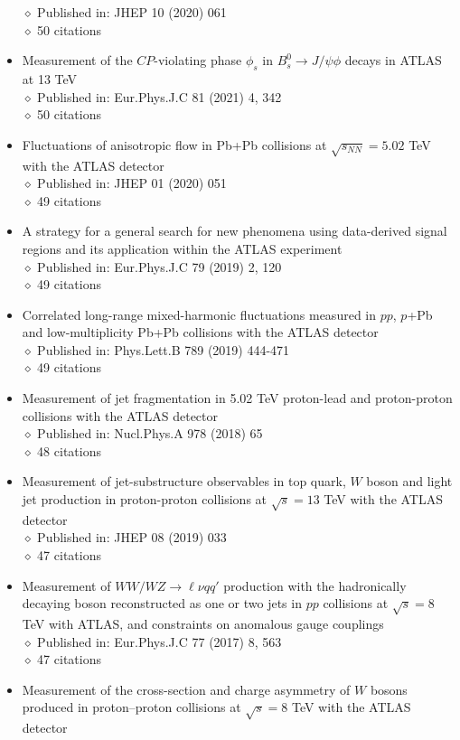 \documentclass[margin, 10pt]{res} %
\begin{document}
\begin{resume}
\begin{itemize}
$\diamond$ Published in: JHEP 10 (2020) 061\\
$\diamond$ 50 citations
\item Measurement of the $CP$-violating phase $\phi_{s}$ in $B^{0}_{s} \rightarrow J/\psi\phi$ decays in ATLAS at 13 TeV\\
$\diamond$ Published in: Eur.Phys.J.C 81 (2021) 4, 342\\
$\diamond$ 50 citations
\item Fluctuations of anisotropic flow in Pb+Pb collisions at $\sqrt{s_{NN}} = 5.02$ TeV with the ATLAS detector\\
$\diamond$ Published in: JHEP 01 (2020) 051\\
$\diamond$ 49 citations
\item A strategy for a general search for new phenomena using data-derived signal regions and its application within the ATLAS experiment\\
$\diamond$ Published in: Eur.Phys.J.C 79 (2019) 2, 120\\
$\diamond$ 49 citations
\item Correlated long-range mixed-harmonic fluctuations measured in $pp$, $p$+Pb and low-multiplicity Pb+Pb collisions with the ATLAS detector\\
$\diamond$ Published in: Phys.Lett.B 789 (2019) 444-471\\
$\diamond$ 49 citations
\item Measurement of jet fragmentation in 5.02 TeV proton-lead and proton-proton collisions with the ATLAS detector\\
$\diamond$ Published in: Nucl.Phys.A 978 (2018) 65\\
$\diamond$ 48 citations
\item Measurement of jet-substructure observables in top quark, $W$ boson and light jet production in proton-proton collisions at $\sqrt{s} = 13$ TeV with the ATLAS detector\\
$\diamond$ Published in: JHEP 08 (2019) 033\\
$\diamond$ 47 citations
\item Measurement of $WW/WZ \rightarrow \ell \nu qq'$ production with the hadronically decaying boson reconstructed as one or two jets in $pp$ collisions at $\sqrt{s} = 8$ TeV with ATLAS, and constraints on anomalous gauge couplings\\
$\diamond$ Published in: Eur.Phys.J.C 77 (2017) 8, 563\\
$\diamond$ 47 citations
\item Measurement of the cross-section and charge asymmetry of $W$ bosons produced in proton–proton collisions at $\sqrt{s} = 8$ TeV with the ATLAS detector\\

\end{itemize}
\end{resume}
\end{document}
